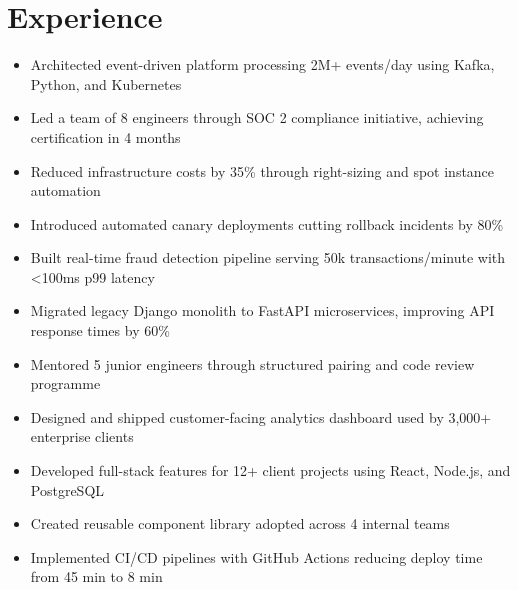
\section{Experience}




\begin{itemize}

  \item Architected event-driven platform processing 2M+ events/day using Kafka, Python, and Kubernetes

  \item Led a team of 8 engineers through SOC 2 compliance initiative, achieving certification in 4 months

  \item Reduced infrastructure costs by 35\% through right-sizing and spot instance automation

  \item Introduced automated canary deployments cutting rollback incidents by 80\%

\end{itemize}





\begin{itemize}

  \item Built real-time fraud detection pipeline serving 50k transactions/minute with <100ms p99 latency

  \item Migrated legacy Django monolith to FastAPI microservices, improving API response times by 60\%

  \item Mentored 5 junior engineers through structured pairing and code review programme

  \item Designed and shipped customer-facing analytics dashboard used by 3,000+ enterprise clients

\end{itemize}





\begin{itemize}

  \item Developed full-stack features for 12+ client projects using React, Node.js, and PostgreSQL

  \item Created reusable component library adopted across 4 internal teams

  \item Implemented CI/CD pipelines with GitHub Actions reducing deploy time from 45 min to 8 min

\end{itemize}



